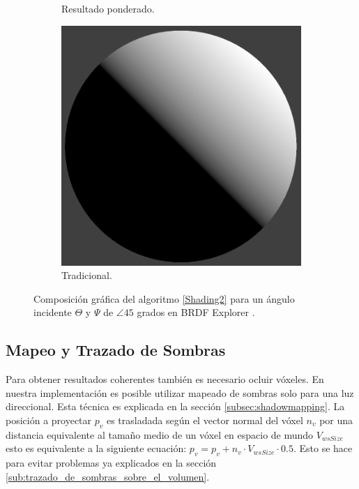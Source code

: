 \begin{figure}[H]
\begin{subfigure}[t]{0.2\textwidth}
		\caption*{Resultado ponderado.}
	\end{subfigure}%
	\begin{subfigure}[t]{0.2\textwidth}
		\centering
		\captionsetup{justification=centering}
		\includegraphics[width=\linewidth]{media/nDotLT.png}
		\caption*{Tradicional.}
	\end{subfigure}%
	\caption{Composición gráfica del algoritmo \ref{Shading2} para un ángulo incidente $\Theta$ y $\Psi$ de $\angle 45$ grados en BRDF Explorer \cite{brdf_explorer}.}
	\label{fig:compositve_vshading}
\end{figure}

\subsection{Mapeo y Trazado de Sombras}

Para obtener resultados coherentes también es necesario ocluir vóxeles. En nuestra implementación es posible utilizar mapeado de sombras solo para una luz direccional. Esta técnica es explicada en la sección \ref{subsec:shadowmapping}. La posición a proyectar $p_{v}$ es trasladada según el vector normal del vóxel $n_{v}$ por una distancia equivalente al tamaño medio de un vóxel en espacio de mundo $V_{wsSize}$ esto es equivalente a la siguiente ecuación: $p_{v} = p_{v} + n_{v}\cdot V_{wsSize} \cdot 0.5$. Esto se hace para evitar problemas ya explicados en la sección \ref{sub:trazado_de_sombras_sobre_el_volumen}.

